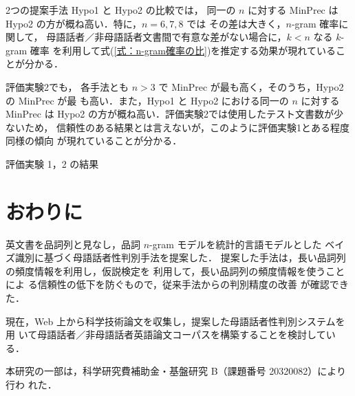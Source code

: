 \documentclass[japanese]{jnlp_1.4}
\begin{document}
2つの提案手法 Hypo1 と Hypo2 の比較では，
同一の $n$ に対する MinPrec は Hypo2 の方が概ね高い．特に，$n=6,7,8$ では
その差は大きく，$n$-gram 確率に関して，
母語話者／非母語話者文書間で有意な差がない場合に，$k<n$ なる $k$-gram 確率
を利用して式(\ref{式：n-gram確率の比})を推定する効果が現れていることが分かる．

評価実験2でも，
各手法とも $n>3$ で MinPrec が最も高く，そのうち，Hypo2 の MinPrec が最
も高い．また，Hypo1 と Hypo2 における同一の $n$ に対する MinPrec は
Hypo2 の方が概ね高い．評価実験2では使用したテスト文書数が少ないため，
信頼性のある結果とは言えないが，このように評価実験1とある程度同様の傾向
が現れていることが分かる．

\begin{table}[t]
\caption{評価実験 1，2 の結果}
\label{実験結果}

\end{table}


\section{おわりに}

英文書を品詞列と見なし，品詞 $n$-gram モデルを統計的言語モデルとした
ベイズ識別に基づく母語話者性判別手法を提案した．
提案した手法は，長い品詞列の頻度情報を利用し，仮説検定を
利用して，長い品詞列の頻度情報を使うことによ
る信頼性の低下を防ぐもので，従来手法からの判別精度の改善
が確認できた．

現在，Web 上から科学技術論文を収集し，提案した母語話者性判別システムを用
いて母語話者／非母語話者英語論文コーパスを構築することを検討している．



\acknowledgment
本研究の一部は，科学研究費補助金・基盤研究 B（課題番号 20320082）により行わ
れた．
\end{document}
